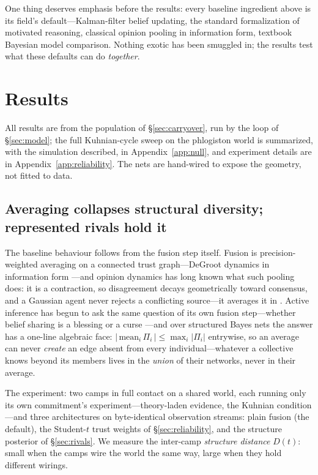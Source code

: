 \documentclass[runningheads]{llncs}
\begin{document}
One thing deserves emphasis before the results: every baseline ingredient above is its field's
default---Kalman-filter belief updating, the standard formalization of motivated reasoning,
classical opinion pooling in information form, textbook Bayesian model comparison. Nothing
exotic has been smuggled in; the results test what these defaults can do \emph{together}.

\section{Results}
\label{sec:results}

All results are from the population of \S\ref{sec:carryover}, run by the loop of
\S\ref{sec:model}; the full Kuhnian-cycle sweep on the phlogiston world is summarized, with
the simulation described, in Appendix~\ref{app:null}, and experiment details are in
Appendix~\ref{app:reliability}. The nets are hand-wired to expose the geometry, not fitted to
data.

\subsection{Averaging collapses structural diversity; represented rivals hold it}
\label{sec:res-homogeneity}
\label{sec:res-distinct}

The baseline behaviour follows from the fusion step itself. Fusion is precision-weighted
averaging on a connected trust graph---DeGroot dynamics in information form
\citep{degroot1974,acemoglu2011}---and opinion dynamics has long known what such pooling
does: it is a contraction, so disagreement decays geometrically toward consensus, and a
Gaussian agent never rejects a conflicting source---it averages it in
\citep{dawid1973,ohagan1979,ohagan2012}. Active inference has begun to ask the same question
of its own fusion step---whether belief sharing is a blessing or a curse
\citep{catal2024}---and over structured Bayes nets the answer has a one-line algebraic face:
$|\,\mathrm{mean}_i\,\Pi_i\,|\le\max_i|\Pi_i|$ entrywise, so an
average can never \emph{create} an edge absent from every individual---whatever a collective
knows beyond its members lives in the \emph{union} of their networks, never in their
average.

The experiment: two camps in full contact on a shared world, each running only its own
commitment's experiment---theory-laden evidence, the Kuhnian condition---and three
architectures on byte-identical observation streams: plain fusion (the default), the
Student-$t$ trust weights of \S\ref{sec:reliability}, and the structure posterior of
\S\ref{sec:rivals}. We measure the inter-camp \emph{structure distance} $D(t)$: small when
the camps wire the world the same way, large when they hold different wirings.
\end{document}
